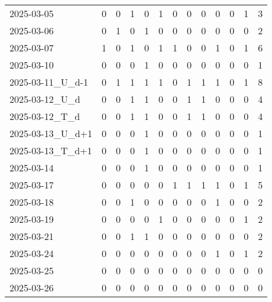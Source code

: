 \documentclass[dvipdfmx,oneside]{article}
\begin{document}
\begin{longtable}{lcccccccccccc}
        2025-03-05 &     0 &     0 &     1 &     0 &     1 &     0 &     0 &     0 &     0 &     0 &     1 &      3 \\
        2025-03-06 &     0 &     1 &     0 &     1 &     0 &     0 &     0 &     0 &     0 &     0 &     0 &      2 \\
        2025-03-07 &     1 &     0 &     1 &     0 &     1 &     1 &     0 &     0 &     1 &     0 &     1 &      6 \\
        2025-03-10 &     0 &     0 &     0 &     1 &     0 &     0 &     0 &     0 &     0 &     0 &     0 &      1 \\
2025-03-11\_U\_d-1 &     0 &     1 &     1 &     1 &     1 &     0 &     1 &     1 &     1 &     0 &     1 &      8 \\
  2025-03-12\_U\_d &     0 &     0 &     1 &     1 &     0 &     0 &     1 &     1 &     0 &     0 &     0 &      4 \\
  2025-03-12\_T\_d &     0 &     0 &     1 &     1 &     0 &     0 &     1 &     1 &     0 &     0 &     0 &      4 \\
2025-03-13\_U\_d+1 &     0 &     0 &     0 &     1 &     0 &     0 &     0 &     0 &     0 &     0 &     0 &      1 \\
2025-03-13\_T\_d+1 &     0 &     0 &     0 &     1 &     0 &     0 &     0 &     0 &     0 &     0 &     0 &      1 \\
        2025-03-14 &     0 &     0 &     0 &     1 &     0 &     0 &     0 &     0 &     0 &     0 &     0 &      1 \\
        2025-03-17 &     0 &     0 &     0 &     0 &     0 &     1 &     1 &     1 &     1 &     0 &     1 &      5 \\
        2025-03-18 &     0 &     0 &     1 &     0 &     0 &     0 &     0 &     0 &     1 &     0 &     0 &      2 \\
        2025-03-19 &     0 &     0 &     0 &     0 &     1 &     0 &     0 &     0 &     0 &     0 &     1 &      2 \\
        2025-03-21 &     0 &     0 &     1 &     1 &     0 &     0 &     0 &     0 &     0 &     0 &     0 &      2 \\
        2025-03-24 &     0 &     0 &     0 &     0 &     0 &     0 &     0 &     0 &     1 &     0 &     1 &      2 \\
        2025-03-25 &     0 &     0 &     0 &     0 &     0 &     0 &     0 &     0 &     0 &     0 &     0 &      0 \\
        2025-03-26 &     0 &     0 &     0 &     0 &     0 &     0 &     0 &     0 &     0 &     0 &     0 &      0 \\

\end{longtable}
\end{document}
